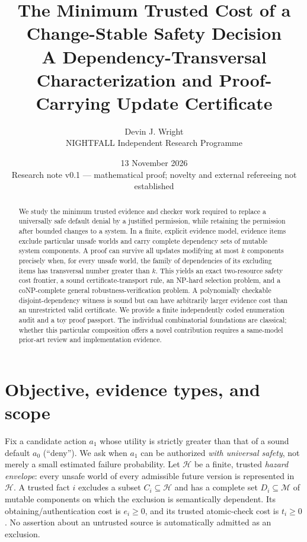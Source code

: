 \documentclass[11pt]{article}
\title{\vspace{-1.1cm}\bfseries The Minimum Trusted Cost of a Change-Stable Safety Decision\\[0.25em]
\large A Dependency-Transversal Characterization and Proof-Carrying Update Certificate}
\author{Devin J. Wright\\NIGHTFALL Independent Research Programme}
\date{13 November 2026\\\small Research note v0.1 --- mathematical proof; novelty and external refereeing not established}
\newcommand{\cm}{\mathcal M}\newcommand{\ch}{\mathcal H}\newcommand{\ci}{\mathcal I}
\begin{document}
\maketitle
\begin{abstract}
We study the minimum trusted evidence and checker work required to replace a universally safe default denial by a justified permission, while retaining the permission after bounded changes to a system. In a finite, explicit evidence model, evidence items exclude particular unsafe worlds and carry complete dependency sets of mutable system components. A proof can survive all updates modifying at most $k$ components precisely when, for every unsafe world, the family of dependencies of its excluding items has transversal number greater than $k$. This yields an exact two-resource safety cost frontier, a sound certificate-transport rule, an NP-hard selection problem, and a coNP-complete general robustness-verification problem. A polynomially checkable disjoint-dependency witness is sound but can have arbitrarily larger evidence cost than an unrestricted valid certificate. We provide a finite independently coded enumeration audit and a toy proof passport. The individual combinatorial foundations are classical; whether this particular composition offers a novel contribution requires a same-model prior-art review and implementation evidence.
\end{abstract}

\section{Objective, evidence types, and scope}
Fix a candidate action $a_1$ whose utility is strictly greater than that of a sound default $a_0$ (``deny''). We ask when $a_1$ can be authorized \emph{with universal safety}, not merely a small estimated failure probability. Let $\ch$ be a finite, trusted \emph{hazard envelope}: every unsafe world of every admissible future version is represented in $\ch$. A trusted fact $i$ excludes a subset $C_i\subseteq\ch$ and has a complete set $D_i\subseteq\cm$ of mutable components on which the exclusion is semantically dependent. Its obtaining/authentication cost is $e_i\ge0$, and its trusted atomic-check cost is $t_i\ge0$. No assertion about an untrusted source is automatically admitted as an exclusion.
\end{document}
